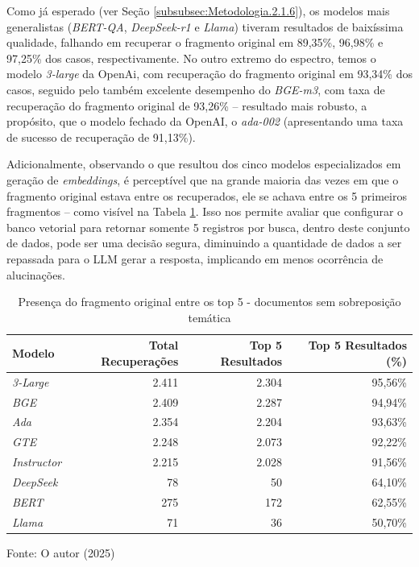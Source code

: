 Como já esperado (ver Seção \ref{subsubsec:Metodologia.2.1.6}), os modelos mais generalistas (\textit{BERT-QA}, \textit{DeepSeek-r1} e \textit{Llama}) tiveram resultados de baixíssima qualidade, falhando em recuperar o fragmento original em 89,35\%, 96,98\% e 97,25\% dos casos, respectivamente. No outro extremo do espectro, temos o modelo \textit{3-large} da OpenAi, com recuperação do fragmento original em 93,34\% dos casos, seguido pelo também excelente desempenho do \textit{BGE-m3}, com taxa de recuperação do fragmento original de 93,26\% -- resultado mais robusto, a propósito, que o modelo fechado da OpenAI, o \textit{ada-002} (apresentando uma taxa de sucesso de recuperação de 91,13\%).

Adicionalmente, observando o que resultou dos cinco modelos especializados em geração de \textit{embeddings}, é perceptível que na grande maioria das vezes em que o fragmento original estava entre os recuperados, ele se achava entre os 5 primeiros fragmentos -- como visível na Tabela \ref{tab:recuperacao-5-top}. Isso nos permite avaliar que configurar o banco vetorial para retornar somente 5 registros por busca, dentro deste conjunto de dados, pode ser uma decisão segura, diminuindo a quantidade de dados a ser repassada para o \ac{LLM} gerar a resposta, implicando em menos ocorrência de alucinações.

\begin{table}[H]
    \caption{Presença do fragmento original entre os top 5 - documentos sem sobreposição temática}
    \centering
    \begin{tabular}{ l r r r }
        \hline
        \textbf{Modelo} & \textbf{Total Recuperações} & \textbf{Top 5 Resultados} & \textbf{Top 5 Resultados (\%)} \\
        \hline
        \textit{3-Large} & 2.411 & 2.304 & 95,56\% \\
        \textit{BGE} & 2.409 & 2.287 & 94,94\% \\
        \textit{Ada} & 2.354 & 2.204 & 93,63\% \\
        \textit{GTE} & 2.248 & 2.073 & 92,22\% \\
        \textit{Instructor} & 2.215 & 2.028 & 91,56\% \\
        \textit{DeepSeek} & 78 & 50 & 64,10\% \\
        \textit{BERT} & 275 & 172 & 62,55\% \\
        \textit{Llama} & 71 & 36 & 50,70\% \\
    \hline
    \end{tabular}
    
    Fonte: O autor (2025)
    \label{tab:recuperacao-5-top}
\end{table}

